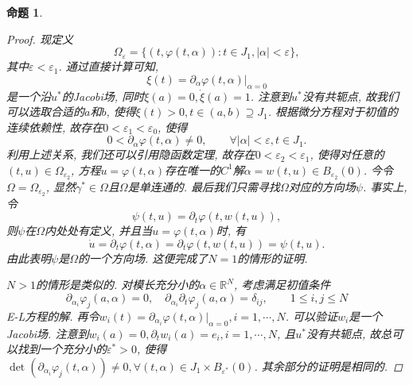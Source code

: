 \documentclass[12pt,a4paper]{article}
\newtheorem{proposition}[theorem]{命题}
\begin{document}
\begin{proposition}
\begin{proof}
        现定义
        \begin{equation*}
            \Omega_{\varepsilon} = \{(t, \varphi(t, \alpha))\colon t \in J_1, |\alpha| < \varepsilon\}, 
        \end{equation*}
        其中$\varepsilon < \varepsilon_1$. 通过直接计算可知, 
        \begin{equation*}
            \xi(t) = \left.\partial_{\alpha}\varphi(t, \alpha)\right|_{\alpha = 0}
        \end{equation*}
        是一个沿$u^*$的Jacobi场, 同时$\xi(a) = 0, \dot\xi(a) = 1$. 注意到$u^*$没有共轭点, 故我们可以选取合适的$a$和$b$, 使得$\xi(t) > 0, t \in (a, b) \supseteq J_1$.
        根据微分方程对于初值的连续依赖性, 故存在$0 < \varepsilon_1 < \varepsilon_0$, 使得 
        \begin{equation*}
            0 < \partial_{\alpha}\varphi(t, \alpha) \neq 0, \qquad \forall |\alpha| < \varepsilon, t \in J_1.
        \end{equation*}
        利用上述关系, 我们还可以引用隐函数定理, 故存在$0 < \varepsilon_2 < \varepsilon_1$, 使得对任意的$(t, u) \in \Omega_{\varepsilon_2}$, 方程$u = \varphi(t, \alpha)$存在唯一的$C^1$解$\alpha = w(t, u) \in B_{\varepsilon_2}(0)$.
        今令$\Omega = \Omega_{\varepsilon_2}$, 显然$\gamma^* \in \Omega$且$\Omega$是单连通的.
        最后我们只需寻找$\Omega$对应的方向场$\psi$. 事实上, 令 
        \begin{equation*}
            \psi(t, u) = \partial_t\varphi(t, w(t, u)),
        \end{equation*}
        则$\psi$在$\Omega$内处处有定义, 并且当$u = \varphi(t, \alpha)$时, 有 
        \begin{equation*}
            \dot u = \partial_t\varphi(t, \alpha) = \partial_t\varphi(t, w(t, u)) = \psi(t, u).
        \end{equation*}
        由此表明$\psi$是$\Omega$的一个方向场. 这便完成了$N = 1$的情形的证明.

        $N > 1$的情形是类似的. 对模长充分小的$\alpha \in \mathbb{R}^N$, 考虑满足初值条件 
        \begin{equation*}
            \partial_{\alpha_i}\varphi_j(a, \alpha) = 0, \quad \partial_{\alpha_i}\partial_t\varphi_j(a, \alpha) = \delta_{ij}, \qquad 1 \leq i, j \leq N
        \end{equation*}
        E-L方程的解. 再令$w_i(t) = \partial_{\alpha_i}\varphi(t, \alpha)|_{\alpha = 0}, i = 1, \cdots, N$.
        可以验证$w_i$是一个Jacobi场. 注意到$w_i(a) = 0, \partial_tw_i(a) = e_i , i = 1, \cdots, N$, 且$u^*$没有共轭点, 故总可以找到一个充分小的$\varepsilon^* > 0$, 使得$\det(\partial_{\alpha_i}\varphi_j(t, \alpha)) \neq 0, \forall (t, \alpha) \in J_1 \times B_{\varepsilon^*}(0)$.
        其余部分的证明是相同的.
    \end{proof}
\end{proposition}
\end{document}

